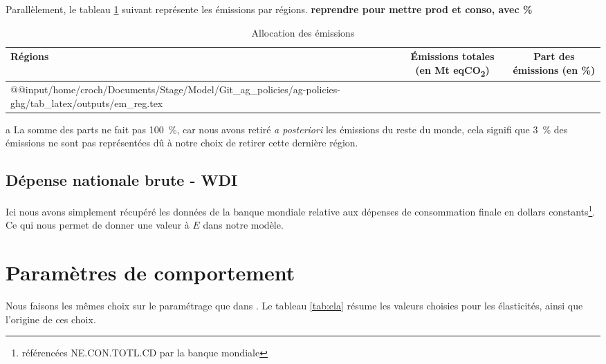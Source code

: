 Parallèlement, le tableau \ref{tab:em_reg} suivant représente les émissions par régions. \textbf{reprendre pour mettre prod et conso, avec \%}

\begin{table}[h]
    \centering
    \begin{threeparttable}
        \begin{tabularx}{\textwidth}{p{1.9in}cc}
            \textbf{Régions} & \textbf{Émissions totales} (en Mt eqCO\textsubscript{2}) & \textbf{Part des émissions}\tnote{a} (en \%) \\ \hline
            \csname @@input\endcsname /home/croch/Documents/Stage/Model/Git_ag_policies/ag-policies-ghg/tab_latex/outputs/em_reg.tex
            \hline
        \end{tabularx}
        \begin{tablenotes}
            \footnotesize
            \item[a] La somme des parts ne fait pas 100~\%, car nous avons retiré \textit{a posteriori} les émissions du reste du monde, cela signifi que 3~\% des émissions ne sont pas représentées dû à notre choix de retirer cette dernière région.
        \end{tablenotes}
        \caption{Allocation des émissions}
        \label{tab:em_reg}
    \end{threeparttable}
\end{table}

\subsection{Dépense nationale brute - WDI}

Ici nous avons simplement récupéré les données de la banque mondiale relative aux dépenses de consommation finale en dollars constants\footnote{référencées NE.CON.TOTL.CD par la banque mondiale}. Ce qui nous permet de donner une valeur à $E$ dans notre modèle.


\section{Paramètres de comportement}
Nous faisons les mêmes choix sur le paramétrage que dans \cite{Gouel2025}. Le tableau \ref{tab:ela} résume les valeurs choisies pour les élasticités, ainsi que l'origine de ces choix.

